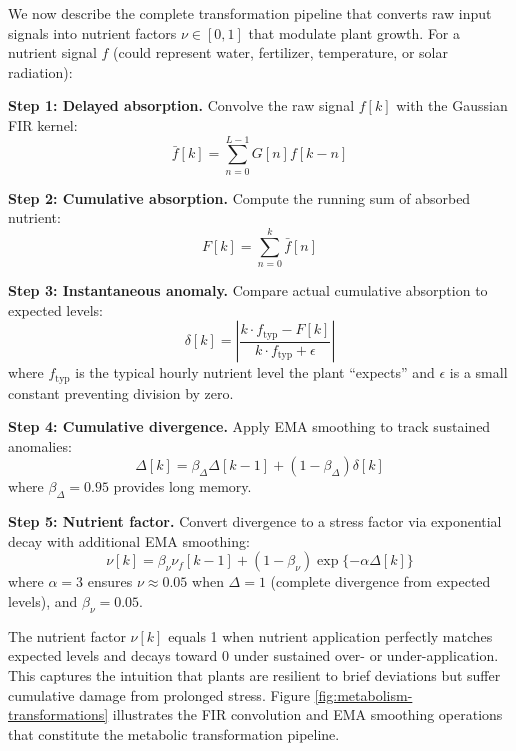 \documentclass[pdflatex,sn-mathphys-num]{sn-jnl}
\newcommand{\df}[2]{\displaystyle\frac{#1}{#2}}
\begin{document}
We now describe the complete transformation pipeline that converts raw input signals into nutrient factors $\nu \in [0,1]$ that modulate plant growth. For a nutrient signal $f$ (could represent water, fertilizer, temperature, or solar radiation):

\textbf{Step 1: Delayed absorption.} Convolve the raw signal $f[k]$ with the Gaussian FIR kernel:
\begin{equation}
\bar{f}[k] = \sum_{n=0}^{L-1} G[n]f[k-n]
\label{eqn:delayed-trans}
\end{equation}

\textbf{Step 2: Cumulative absorption.} Compute the running sum of absorbed nutrient:
\begin{equation}
F[k] = \sum_{n=0}^{k} \bar{f}[n]
\label{eqn:cum-trans}
\end{equation}

\textbf{Step 3: Instantaneous anomaly.} Compare actual cumulative absorption to expected levels:
\begin{equation}
\delta[k] = \left| \df{k \cdot f_{\text{typ}} - F[k]}{k \cdot f_{\text{typ}} + \epsilon} \right|
\label{eqn:anomaly-trans}
\end{equation}
where $f_{\text{typ}}$ is the typical hourly nutrient level the plant ``expects'' and $\epsilon$ is a small constant preventing division by zero.

\textbf{Step 4: Cumulative divergence.} Apply EMA smoothing to track sustained anomalies:
\begin{equation}
\Delta[k] = \beta_{\Delta} \Delta[k-1] + (1 - \beta_{\Delta}) \delta[k]
\label{eqn:cum-div-trans}
\end{equation}
where $\beta_{\Delta} = 0.95$ provides long memory.

\textbf{Step 5: Nutrient factor.} Convert divergence to a stress factor via exponential decay with additional EMA smoothing:
\begin{equation}
\nu[k] = \beta_{\nu} \nu_{f}[k-1] + (1 - \beta_{\nu}) \exp\{ -\alpha\Delta[k] \}
\label{eqn:nut-fac-trans}
\end{equation}
where $\alpha = 3$ ensures $\nu \approx 0.05$ when $\Delta = 1$ (complete divergence from expected levels), and $\beta_{\nu} = 0.05$.

The nutrient factor $\nu[k]$ equals 1 when nutrient application perfectly matches expected levels and decays toward 0 under sustained over- or under-application. This captures the intuition that plants are resilient to brief deviations but suffer cumulative damage from prolonged stress. Figure \ref{fig:metabolism-transformations} illustrates the FIR convolution and EMA smoothing operations that constitute the metabolic transformation pipeline.
\end{document}
